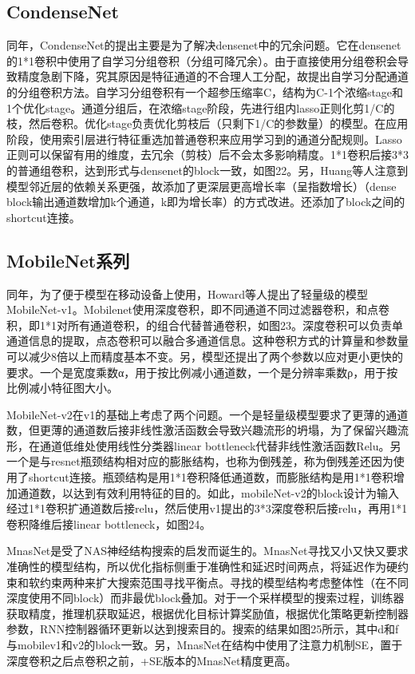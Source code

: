 \documentclass[15pt]{article}
\begin{document}
\subsection{CondenseNet}
同年，CondenseNet的提出主要是为了解决densenet中的冗余问题\cite{ref81}。它在densenet的1*1卷积中使用了自学习分组卷积（分组可降冗余）。由于直接使用分组卷积会导致精度急剧下降，究其原因是特征通道的不合理人工分配，故提出自学习分配通道的分组卷积方法。自学习分组卷积有一个超参压缩率C，结构为C-1个浓缩stage和1个优化stage。通道分组后，在浓缩stage阶段，先进行组内lasso正则化剪1/C的枝，然后卷积。优化stage负责优化剪枝后（只剩下1/C的参数量）的模型。在应用阶段，使用索引层进行特征重选加普通卷积来应用学习到的通道分配规则。Lasso正则可以保留有用的维度，去冗余（剪枝）后不会太多影响精度。1*1卷积后接3*3的普通组卷积，达到形式与densenet的block一致，如图22。另，Huang等人注意到模型邻近层的依赖关系更强，故添加了更深层更高增长率（呈指数增长）（dense block输出通道数增加k个通道，k即为增长率）的方式改进。还添加了block之间的shortcut连接。

\subsection{MobileNet系列}
同年，为了便于模型在移动设备上使用，Howard等人提出了轻量级的模型MobileNet-v1\cite{ref82}。Mobilenet使用深度卷积，即不同通道不同过滤器卷积，和点卷积，即1*1对所有通道卷积，的组合代替普通卷积，如图23。深度卷积可以负责单通道信息的提取，点态卷积可以融合多通道信息。这种卷积方式的计算量和参数量可以减少8倍以上而精度基本不变。另，模型还提出了两个参数以应对更小更快的要求。一个是宽度乘数α，用于按比例减小通道数，一个是分辨率乘数ρ，用于按比例减小特征图大小。

MobileNet-v2在v1的基础上考虑了两个问题\cite{ref83}。一个是轻量级模型要求了更薄的通道数，但更薄的通道数后接非线性激活函数会导致兴趣流形的坍塌，为了保留兴趣流形，在通道低维处使用线性分类器linear bottleneck代替非线性激活函数Relu。另一个是与resnet瓶颈结构相对应的膨胀结构，也称为倒残差，称为倒残差还因为使用了shortcut连接。瓶颈结构是用1*1卷积降低通道数，而膨胀结构是用1*1卷积增加通道数，以达到有效利用特征的目的。如此，mobileNet-v2的block设计为输入经过1*1卷积扩通道数后接relu，然后使用v1提出的3*3深度卷积后接relu，再用1*1卷积降维后接linear bottleneck，如图24。

MnasNet\cite{ref84}是受了NAS神经结构搜索\cite{ref89}的启发而诞生的。MnasNet寻找又小又快又要求准确性的模型结构，所以优化指标侧重于准确性和延迟时间两点，将延迟作为硬约束和软约束两种来扩大搜索范围寻找平衡点。寻找的模型结构考虑整体性（在不同深度使用不同block）而非最优block叠加。对于一个采样模型的搜索过程，训练器获取精度，推理机获取延迟，根据优化目标计算奖励值，根据优化策略更新控制器参数，RNN控制器循环更新以达到搜索目的。搜索的结果如图25所示，其中d和f与mobilev1和v2的block一致。另，MnasNet在结构中使用了注意力机制SE，置于深度卷积之后点卷积之前，+SE版本的MnasNet精度更高。
\end{document}

